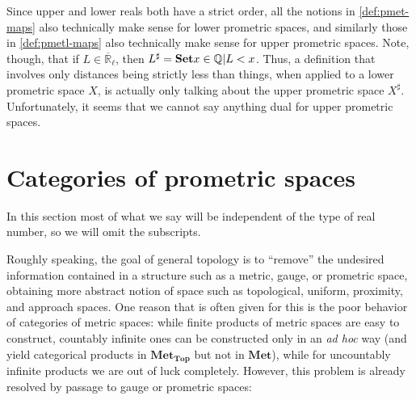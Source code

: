 \documentclass{article}
\def\Q{\mathbb{Q}}
\def\R{\mathbb{R}}
\def\Re{\overline{\R}}
\def\Reu{\Re_u}
\def\Rel{\Re_{\ell}}
\def\upp#1{{#1}^{\sharp}}
\def\low#1{{#1}^{\flat}}
\def\Met{\mathbf{Met}}
\def\MetTop{\mathbf{Met}_{\mathbf{Top}}}
\begin{document}
\begin{rmk}
  Since upper and lower reals both have a strict order, all the notions in \cref{def:pmet-maps} also technically make sense for lower prometric spaces, and similarly those in \cref{def:pmetl-maps} also technically make sense for upper prometric spaces.
  Note, though, that if $L\in\Rel$, then $\upp{L} = \setof{ x\in\Q | L < x }$.
  Thus, a definition that involves only distances being strictly less than things, when applied to a lower prometric space $X$, is actually only talking about the upper prometric space $\upp{X}$.
  Unfortunately, it seems that we cannot say anything dual for upper prometric spaces.
\end{rmk}


\section{Categories of prometric spaces}
\label{sec:sub-promet}

In this section most of what we say will be independent of the type of real number, so we will omit the subscripts.

Roughly speaking, the goal of general topology is to ``remove'' the undesired information contained in a structure such as a metric, gauge, or prometric space, obtaining more abstract notion of space such as topological, uniform, proximity, and approach spaces.
One reason that is often given for this is the poor behavior of categories of metric spaces: while finite products of metric spaces are easy to construct, countably infinite ones can be constructed only in an \textit{ad hoc} way (and yield categorical products in $\MetTop$ but not in $\Met$), while for uncountably infinite products we are out of luck completely.
However, this problem is already resolved by passage to gauge or prometric spaces:
\end{document}
